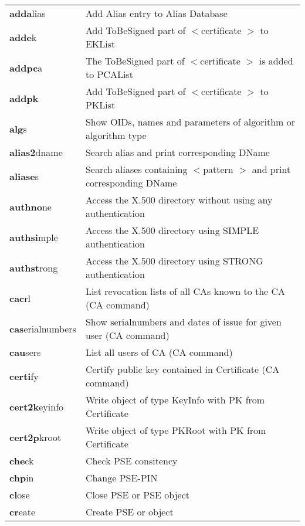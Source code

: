\begin{tabular}{ll}
{\bf adda}lias     & Add Alias entry to Alias Database           		       \\
{\bf adde}k        & Add ToBeSigned part of $<$certificate $>$ to EKList    		       \\
{\bf addpc}a       & The ToBeSigned part of $<$certificate $>$ is added to PCAList          \\
{\bf addpk}        & Add ToBeSigned part of $<$certificate $>$ to PKList    		       \\
{\bf alg}s         & Show OIDs, names and parameters of algorithm or algorithm type    \\
{\bf alias2}dname  & Search alias and print corresponding DName                        \\
{\bf aliase}s      & Search aliases containing $<$pattern $>$ and print corresponding DName \\
{\bf authno}ne     & Access the X.500 directory without using any authentication       \\
{\bf authsi}mple   & Access the X.500 directory using SIMPLE authentication            \\
{\bf authst}rong   & Access the X.500 directory using STRONG authentication            \\
{\bf cac}rl        & List revocation lists of all CAs known to the CA (CA command) \\
{\bf cas}erialnumbers & Show serialnumbers and dates of issue for given user (CA command) \\
{\bf cau}sers      & List all users of CA (CA command)                                 \\
{\bf certi}fy      & Certify public key contained in Certificate (CA command)          \\
{\bf cert2k}eyinfo & Write object of type KeyInfo with PK from Certificate             \\
{\bf cert2p}kroot  & Write object of type PKRoot with PK from Certificate              \\
{\bf che}ck        & Check PSE consitency                                              \\
{\bf chp}in        & Change PSE-PIN                                                    \\
{\bf cl}ose        & Close PSE or PSE object                                           \\
{\bf cr}eate       & Create PSE or object                                              \\

\end{tabular}

